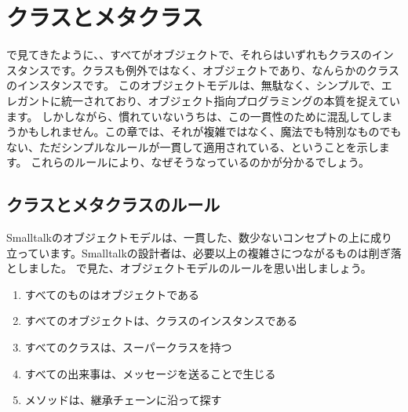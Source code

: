 \documentclass[a4paper,10pt,twoside]{book}
\begin{document}
	\renewcommand{\nnbb}[2]{} %
	\sloppy
\fi
\chapter{クラスとメタクラス}


で見てきたように、、すべてがオブジェクトで、それらはいずれもクラスのインスタンスです。クラスも例外ではなく、オブジェクトであり、なんらかのクラスのインスタンスです。
このオブジェクトモデルは、無駄なく、シンプルで、エレガントに統一されており、オブジェクト指向プログラミングの本質を捉えています。
しかしながら、慣れていないうちは、この一貫性のために混乱してしまうかもしれません。この章では、それが複雑ではなく、魔法でも特別なものでもない、ただシンプルなルールが一貫して適用されている、ということを示します。
これらのルールにより、なぜそうなっているのかが分かるでしょう。

\section{クラスとメタクラスのルール}

Smalltalkのオブジェクトモデルは、一貫した、数少ないコンセプトの上に成り立っています。Smalltalkの設計者は、必要以上の複雑さにつながるものは削ぎ落としました。
で見た、オブジェクトモデルのルールを思い出しましょう。

\begin{enumerate}[label={\textbf{Rule \arabic{*}}.}, ref={Rule \arabic{*}}, leftmargin=*, widest=10]
\item{} %
	すべてのものはオブジェクトである

\item{} %
	すべてのオブジェクトは、クラスのインスタンスである

\item{} %
	すべてのクラスは、スーパークラスを持つ

\item{} %
	すべての出来事は、メッセージを送ることで生じる

\item{} %
	メソッドは、継承チェーンに沿って探す

\end{enumerate}
\end{document}
